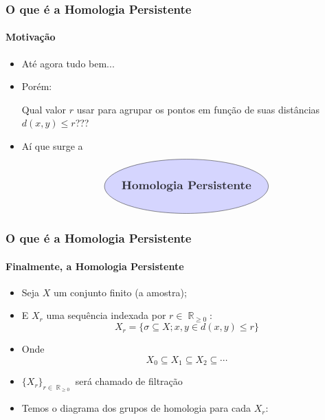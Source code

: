 \documentclass[11pt]{beamer}
\DeclareMathOperator{\R}{\mathbb{R}}
\begin{document}
    \begin{frame}
        \frametitle{O que é a Homologia Persistente}
        \framesubtitle{Motivação}

        \begin{itemize}
            \item
                Até agora tudo bem...

            \item
                Porém:

                \begin{center}
                    Qual valor $r$ usar para agrupar os pontos em função
                    de suas distâncias $d(x,y) \leq r$???
                \end{center}

            \item
                Aí que surge a 
                \[
                \begin{tikzpicture}
                    \draw[fill=blue!20!white, opacity=0.8]
                        (0,0) ellipse (3cm and 1cm) node[midway, scale=1.2] 
                        {\textbf{Homologia Persistente}};
                \end{tikzpicture}
                \]

        \end{itemize}

    \end{frame}

    \begin{frame}
        \frametitle{O que é a Homologia Persistente}
        \framesubtitle{Finalmente, a Homologia Persistente}

        \begin{itemize}
            \item
                Seja $X$ um conjunto finito (a amostra);

            \item
                E $X_r$ uma sequência indexada por $r \in \R_{\geq 0}$:
                \begin{equation*}
                    X_r = \{\sigma \subseteq X; x,y \in d(x,y) \leq r\}
                \end{equation*}

            \item Onde 
                \begin{equation*}
                    X_0 \subseteq X_1 \subseteq X_2 \subseteq \cdots
                \end{equation*}

            \item
                $\{X_r\}_{r \in \R_{\geq 0}}$ será chamado de filtração

            \item 
                Temos o diagrama dos grupos de homologia para cada $X_r$:
        \end{itemize}
        
    \end{frame}
\end{document}
